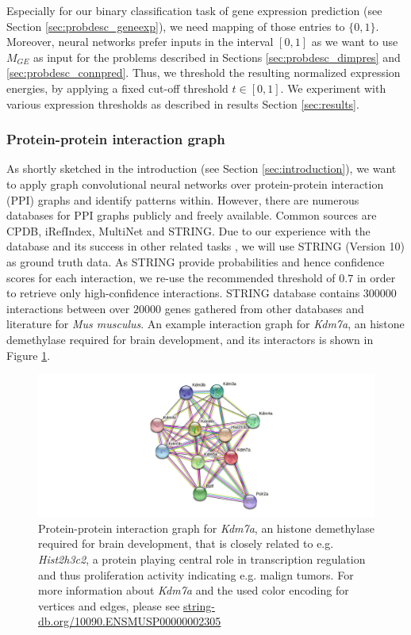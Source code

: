 \documentclass[]{article}
\renewcommand{\cite}{\citep}
\begin{document}
Especially for our binary classification task of gene expression prediction (see Section \ref{sec:probdesc_geneexp}), we need mapping of those entries to $\{0,1\}$. Moreover, neural networks prefer inputs in the interval $[0,1]$ as we want to use $M_{GE}$ as input for the problems described in Sections \ref{sec:probdesc_dimpres} and \ref{sec:probdesc_connpred}. Thus, we threshold the resulting normalized expression energies, by applying a fixed cut-off threshold $t\in[0,1]$. We experiment with various expression thresholds as described in results Section \ref{sec:results}.

\subsubsection{Protein-protein interaction graph}
As shortly sketched in the introduction (see Section \ref{sec:introduction}), we want to apply graph convolutional neural networks over protein-protein interaction (PPI) graphs and identify patterns within. However, there are numerous databases for PPI graphs publicly and freely available.
Common sources are CPDB\cite{lo2009cpdb}, iRefIndex\cite{razick2008irefindex}, MultiNet\cite{sengupta2023multinet} and STRING\cite{STRINGv10}. Due to our experience with the database and its success in other related tasks \cite{schulte2021integration, wang2021mogonet, hinnerichs2021dti}, we will use STRING (Version 10) as ground truth data. As STRING provide probabilities and hence confidence scores for each interaction, we re-use the recommended threshold of $0.7$ in order to retrieve only high-confidence interactions. STRING database contains $300000$ interactions between over $20000$ genes gathered from other databases and literature for \textit{Mus musculus}. An example interaction graph for \textit{Kdm7a}, an histone demethylase required for brain development, and its interactors is shown in Figure \ref{fig:PPI_graph}.

\begin{figure}
	\centering
	\includegraphics[width=1.\linewidth]{figures/string_hires_image.png}
	\caption{Protein-protein interaction graph for \textit{Kdm7a}, an histone demethylase required for brain development, that is closely related to e.g. \textit{Hist2h3c2}, a protein playing central role in transcription regulation and thus proliferation activity indicating e.g. malign tumors. For more information about \textit{Kdm7a} and the used color encoding for vertices and edges, please see \href{https://string-db.org/network/10090.ENSMUSP00000002305}{string-db.org/10090.ENSMUSP00000002305}}
	\label{fig:PPI_graph}
\end{figure}
\end{document}
